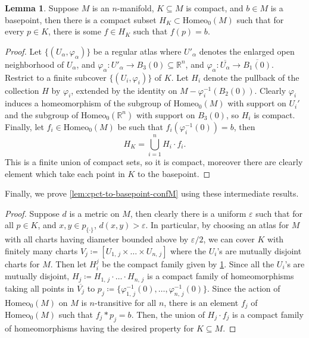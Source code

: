\documentclass[10pt, oneside]{article}
\newcommand{\R}{\mathbb{R}}
\newcommand{\homeo}[1][S^1]{\text{Homeo}_0(#1)}
\newcommand{\cl}[1]{\overline{#1}}
\newcommand{\set}{{\{\cdot\}}}
\theoremstyle{definition}
\newtheorem{lem}{Lemma}[section]
\theoremstyle{definition}
\begin{document}
\begin{lem}\label{lem:cpct-to-basepoint-M}
    Suppose $M$ is an $n$-manifold, $K\subseteq M$ is compact, and $b\in M$ is a basepoint, then there is a compact subset $H_K\subset\homeo[M]$ such that for every $p\in K$, there is some $f\in H_K$ such that $f(p)=b$.
\end{lem}
\begin{proof}
    Let $\{(U_\alpha, \varphi_\alpha)\}$ be a regular atlas where $U'_\alpha$ denotes the enlarged open neighborhood of $U_\alpha$, and $\varphi_\alpha:U'_\alpha \to B_3(0)\subseteq \R^n$, and $\varphi_\alpha:\cl{U_\alpha} \to \cl{B_1(0)}$. Restrict to a finite subcover $\{(U_i, \varphi_i)\}$ of $K$. Let $H_i$ denote the pullback of the collection $H$ by $\varphi_i$, extended by the identity on $M-\varphi_i^{-1}(B_2(0))$. Clearly $\varphi_i$ induces a homeomorphism of the subgroup of $\homeo[M]$ with support on $U_i'$ and the subgroup of $\homeo[\R^n]$ with support on $B_3(0)$, so $H_i$ is compact. Finally, let $f_i\in\homeo[M]$ be such that $f_i(\varphi_i^{-1}(0)) = b$, then $$H_K = \bigcup_{i=1}^n H_i\cdot f_i.$$
    This is a finite union of compact sets, so it is compact, moreover there are clearly element which take each point in $K$ to the basepoint.
\end{proof}

Finally, we prove \cref{lem:cpct-to-basepoint-confM} using these intermediate results.

\begin{proof}
    Suppose $d$ is a metric on $M$, then clearly there is a uniform $\varepsilon$ such that for all $p\in K$, and $x, y\in p_\set$, $d(x,y)>\varepsilon$. In particular, by choosing an atlas for $M$ with all charts having diameter bounded above by $\varepsilon/2$, we can cover $K$ with finitely many charts $V_j \coloneqq [U_{1,\,j}\times\dots\times U_{n,\, j}]$ where the $U_i$'s are mutually disjoint charts for $M$. Then let $H^j_i$ be the compact family given by \cref{lem:cpct-to-basepoint-M}. Since all the $U_i$'s are mutually disjoint, $H_j\coloneqq H_{1,\,j}\cdot\ldots\cdot H_{n,\, j}$ is a compact family of homeomorphisms taking all points in $\cl{V_j}$ to $p_j\coloneqq\{\varphi_{1,\, j}^{-1}(0),\dots, \varphi_{n,\, j}^{-1}(0)\}$. Since the action of $\homeo[M]$ on $M$ is $n$-transitive for all $n$, there is an element $f_j$ of $\homeo[M]$ such that $f_j*p_j = b$. Then, the union of $H_j\cdot f_j$ is a compact family of homeomorphisms having the desired property for $K\subseteq M$.
\end{proof}
\end{document}
